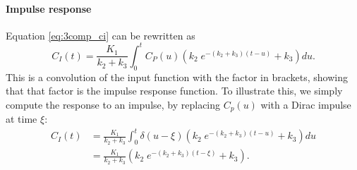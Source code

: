 \documentclass[11pt,oneside]{article}
\begin{document}
\paragraph{Impulse response\\}
Equation \ref{eq:3comp_ci} can be rewritten as
\begin{equation}
  C_I(t) = \frac{K_1}{k_2 + k_3} \int_0^t C_P(u) \left(
       k_2 \; e^{-(k_2 + k_3)(t - u)} + k_3 \right) du.
\end{equation}
This is a convolution of the input function with the factor in
brackets, showing that that factor is the impulse response
function. To illustrate this, we simply compute the response to an
impulse, by replacing $C_p(u)$ with a Dirac impulse at time $\xi$:
\begin{align}
  C_I(t) &= \frac{K_1}{k_2 + k_3} \int_0^t \delta(u-\xi) \left(
                k_2 \; e^{-(k_2 + k_3)(t - u)} + k_3 \right) du\\
   &= \frac{K_1}{k_2 + k_3} \left( k_2 \; e^{-(k_2 + k_3)(t - \xi)} +
                k_3 \right).
\end{align}
\end{document}
